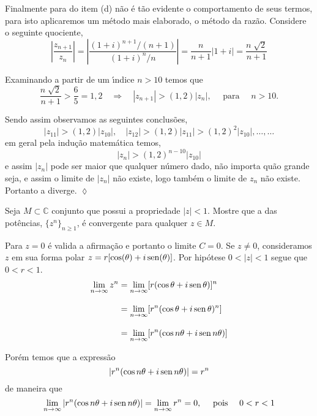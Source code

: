 Finalmente para \seq do item (d) n\~{a}o \'{e} t\~{a}o evidente o
comportamento de seus termos, para isto aplicaremos um m\'{e}todo mais
elaborado, o  m\'{e}todo da raz\~{a}o. Considere o seguinte quociente,
\begin{equation*}
    \left| \frac{z_{n+1}}{z_n} \right|=\left| \frac{(1+i)^{n+1}/(n+1)}{(1+i)^n/n} \right|
    =\frac{n}{n+1}|1+i|=\frac{n\;\sqrt{2}}{n+1}
\end{equation*}

Examinando a partir de um \'{\i}ndice $n > 10$ temos que
\begin{equation*}
\frac{n\;\sqrt{2}}{n+1}>\frac{6}{5}=1,2\quad \Rightarrow\quad |z_{n+1}|>(1,2)|z_n|,\quad\text{ para }\quad  n>10.
\end{equation*}

Sendo assim observamos as seguintes conclus\~{o}es,
\begin{equation*}
|z_{11}|>(1,2)|z_{10}|,\quad  |z_{12}|>(1,2)|z_{11}|>(1,2)^2|z_{10}|,\ldots,\ldots
\end{equation*}
em geral pela indu\c{c}\~{a}o matemática temos,
\begin{equation*}
|z_{n}|>(1,2)^{n-10}|z_{10}|
\end{equation*}
e assim $|z_n|$ pode ser maior que qualquer n\'{u}mero dado, n\~{a}o importa
qu\~{a}o grande seja, e assim o limite de $|z_n|$ n\~{a}o existe, logo
tamb\'{e}m o limite de $z_n$ n\~{a}o existe. Portanto a \seq diverge.
\hfill \(\lozenge\)


\begin{exer}
Seja $M\subset \mathbb{C}$ conjunto  que possui a propriedade $|z|<1$. Mostre que a \seq das pot\^{e}ncias, $\{z^n\}_{n\geq
1}$, \'{e} convergente para qualquer $z\in M$.
\end{exer}

\solo Para $z=0$ \'{e} valida a afirma\c{c}\~{a}o e portanto o limite $C=0$.
Se $z\neq 0$, consideramos $z$ em sua forma polar $z=r[\cos(\theta)+i\operatorname{sen}(\theta)]$. Por hip\'{o}tese $0<|z|<1$ segue que $0<r<1$.
\begin{align*}
  \lim_{n\to\infty} z^n &= \lim_{n\to\infty}[r(\cos \theta+i\operatorname{sen} \theta)]^n \\[2ex]
   &=\lim_{n\to\infty}[r^n(\cos\theta+i\operatorname{sen} \theta)^n]\\[2ex]
   &=\lim_{n\to\infty}[r^n(\cos n\theta+i\operatorname{sen} n\theta)]
\end{align*}

Por\'{e}m temos que a express\~{a}o
\begin{equation*}
  |r^n(\cos n\theta+i\operatorname{sen} n\theta)|=r^n
\end{equation*}
de maneira que
\begin{equation*}
\lim_{n\to\infty}|r^n(\cos n\theta+i\operatorname{sen} n\theta)|=\lim_{n\to\infty}r^n=0,\quad \text{ pois }\quad 0<r<1
\end{equation*}

